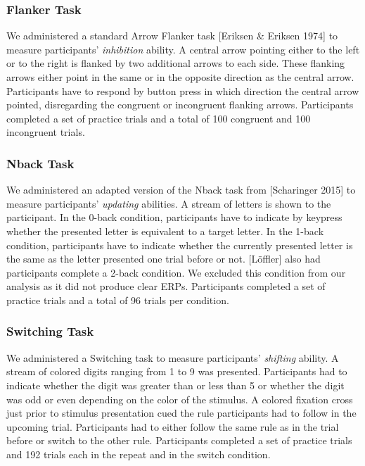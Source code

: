 \documentclass[
  man,floatsintext]{apa7}
\begin{document}
\hypertarget{flanker-task}{%
\subsubsection{Flanker Task}\label{flanker-task}}

We administered a standard Arrow Flanker task {[}Eriksen \& Eriksen 1974{]} to measure participants' \emph{inhibition} ability. A central arrow pointing either to the left or to the right is flanked by two additional arrows to each side. These flanking arrows either point in the same or in the opposite direction as the central arrow. Participants have to respond by button press in which direction the central arrow pointed, disregarding the congruent or incongruent flanking arrows. Participants completed a set of practice trials and a total of 100 congruent and 100 incongruent trials.

\hypertarget{nback-task}{%
\subsubsection{Nback Task}\label{nback-task}}

We administered an adapted version of the Nback task from {[}Scharinger 2015{]} to measure participants' \emph{updating} abilities. A stream of letters is shown to the participant. In the 0-back condition, participants have to indicate by keypress whether the presented letter is equivalent to a target letter. In the 1-back condition, participants have to indicate whether the currently presented letter is the same as the letter presented one trial before or not. {[}Löffler{]} also had participants complete a 2-back condition. We excluded this condition from our analysis as it did not produce clear ERPs. Participants completed a set of practice trials and a total of 96 trials per condition.

\hypertarget{switching-task}{%
\subsubsection{Switching Task}\label{switching-task}}

We administered a Switching task to measure participants' \emph{shifting} ability. A stream of colored digits ranging from 1 to 9 was presented. Participants had to indicate whether the digit was greater than or less than 5 or whether the digit was odd or even depending on the color of the stimulus. A colored fixation cross just prior to stimulus presentation cued the rule participants had to follow in the upcoming trial. Participants had to either follow the same rule as in the trial before or switch to the other rule. Participants completed a set of practice trials and 192 trials each in the repeat and in the switch condition.
\end{document}
